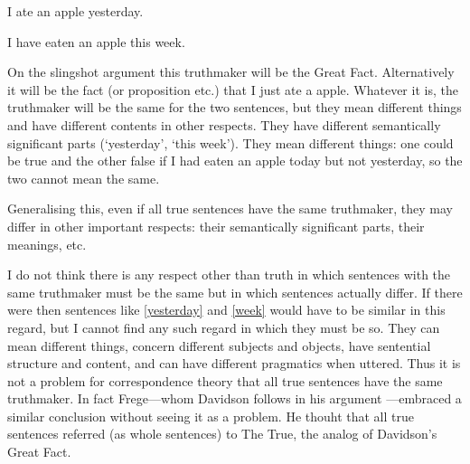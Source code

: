 	\begin{example}\label{yesterday}
	I ate an apple yesterday.
	\end{example}

	\begin{example}\label{week}
	I have eaten an apple this week.
	\end{example}

On the slingshot argument this truthmaker will be the Great Fact.
Alternatively it will be the fact (or proposition etc.) that I just ate a apple.
Whatever it is, the truthmaker will be the same for the two sentences, but they mean different things and have different contents in other respects.
They have different semantically significant parts (`yesterday', `this week').
They mean different things: one could be true and the other false if I had eaten an apple today but not yesterday, so the two cannot mean the same.

Generalising this, even if all true sentences have the same truthmaker, they may differ in other important respects: their semantically significant parts, their meanings, etc.

I do not think there is any respect other than truth in which sentences with the same truthmaker must be the same but in which sentences actually differ. 
If there were then sentences like \ref{yesterday} and \ref{week} would have to be similar in this regard, but I cannot find any such regard in which they must be so.
They can mean different things, concern different subjects and objects, have sentential structure and content, and can have different pragmatics when uttered.
Thus it is not a problem for correspondence theory that all true sentences have the same truthmaker.
In fact Frege---whom Davidson follows in his argument \parencite[750]{Davidson_1969}---embraced a similar conclusion without seeing it as a problem.
He thouht that all true sentences referred (as whole sentences) to The True, the analog of Davidson's Great Fact.
\parencite[216]{Frege_1948}

